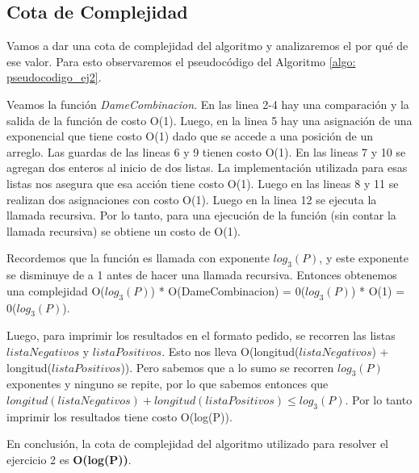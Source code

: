 \subsection{Cota de Complejidad}

\par Vamos a dar una cota de complejidad del algoritmo y analizaremos el por qué de ese valor. Para esto observaremos el pseudocódigo del Algoritmo \ref{algo: pseudocodigo_ej2}.
\par Veamos la función \textit{DameCombinacion}. En las linea 2-4 hay una comparación y la salida de la función de costo O(1). Luego, en la linea 5 hay una asignación de una exponencial que tiene costo O(1) dado que se accede a una posici\'on de un arreglo. Las guardas de las lineas 6 y 9 tienen costo O(1). En las lineas 7 y 10 se agregan dos enteros al inicio de dos listas. La implementación utilizada para esas listas nos asegura que esa acción tiene costo O(1). Luego en las lineas 8 y 11 se realizan dos asignaciones con costo O(1). Luego en la linea 12 se ejecuta la llamada recursiva. Por lo tanto, para una ejecución de la función (sin contar la llamada recursiva) se obtiene un costo de O(1).
\par Recordemos que la función es llamada con exponente $log_{3}(P)$, y este exponente se disminuye de a 1 antes de hacer una llamada recursiva. Entonces obtenemos una complejidad O($log_{3}(P)$) * O(DameCombinacion) = 0($log_{3}(P)$) * O(1) = 0($log_{3}(P)$).
\par Luego, para imprimir los resultados en el formato pedido, se recorren las listas $listaNegativos$ y $listaPositivos$. Esto nos lleva O(longitud($listaNegativos$) + longitud($listaPositivos$)). Pero sabemos que a lo sumo se recorren $log_{3}(P)$ exponentes y ninguno se repite, por lo que sabemos entonces que $longitud(listaNegativos) + longitud(listaPositivos) \leq log_{3}(P)$. Por lo tanto imprimir los resultados tiene costo O(log(P)).

\medskip

\par En conclusión, la cota de complejidad del algoritmo utilizado para resolver el ejercicio 2 es \textbf{O(log(P))}.

\medskip

